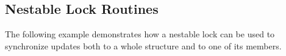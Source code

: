 \subsection{Nestable Lock Routines}
\label{subsec:nestable_lock}

The following example demonstrates how a nestable lock can be used to synchronize 
updates both to a whole structure and to one of its members.



